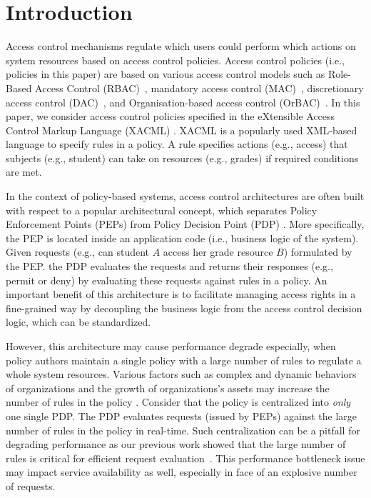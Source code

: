 
\section{Introduction} \label{sec:introduction}

Access control mechanisms regulate which users
could perform which actions on system resources based on access control policies.
Access control policies (i.e., policies in this paper) are based on various access control models such as Role-Based Access Control (RBAC)~\cite{ferraiolo:rbac}, mandatory access control (MAC)~\cite{mac}, 
discretionary access control (DAC)~\cite{dac}, and Organisation-based access control (OrBAC)~\cite{orbac}.
In this paper, we consider access control policies specified in 
the eXtensible Access Control Markup Language (XACML) \cite{sunxacml}. XACML is a popularly used XML-based language to specify rules 
in a policy. A rule specifies actions (e.g., access) that subjects (e.g., student) can take on resources (e.g., grades) if required conditions are met.

In the context of policy-based systems, access control architectures are often built with respect to a popular
architectural concept, which separates Policy Enforcement Points (PEPs) from Policy Decision Point (PDP) \cite{separation}. More specifically, the PEP is located inside an application code (i.e., business logic of the system).
Given requests (e.g., can student $A$ access her grade resource $B$) formulated by the PEP. the PDP evaluates the requests and returns their responses (e.g., permit or deny) by evaluating these requests 
against rules in a policy. An important benefit of this architecture is to facilitate managing access rights in a fine-grained way by decoupling the business logic from the access control decision logic, 
which can be standardized. 

However, this architecture may cause performance degrade
especially, when policy authors maintain a single policy with a large number of rules to regulate a whole system resources. 
Various factors such as complex and dynamic behaviors of organizations and the growth of organizations's assets may increase the 
number of rules in the policy \cite{policymanagement}. 
Consider that the policy is centralized into \emph{only} one single PDP.
The PDP evaluates requests (issued by PEPs) against the large number of rules in the policy in real-time.
Such centralization can be a pitfall for degrading performance as our previous work showed that the large number of rules is critical for efficient request evaluation~\cite{Xengine}.
This performance bottleneck issue may impact service availability as well, especially in face of an explosive number of requests.


